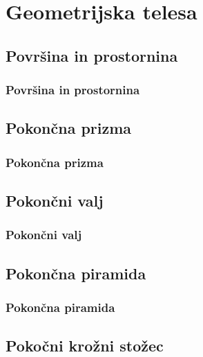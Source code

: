 \section{Geometrijska telesa}

\begin{frame}
    \sectionpage
\end{frame}

\begin{frame}
\end{frame}

    \subsection{Površina in prostornina}

        \begin{frame}
            \frametitle{Površina in prostornina}
        \end{frame}

    \subsection{Pokončna prizma}

        \begin{frame}
            \frametitle{Pokončna prizma}
        \end{frame}

    \subsection{Pokončni valj}

        \begin{frame}
            \frametitle{Pokončni valj}
        \end{frame}

    \subsection{Pokončna piramida}

        \begin{frame}
            \frametitle{Pokončna piramida}
        \end{frame}

    \subsection{Pokočni krožni stožec}

